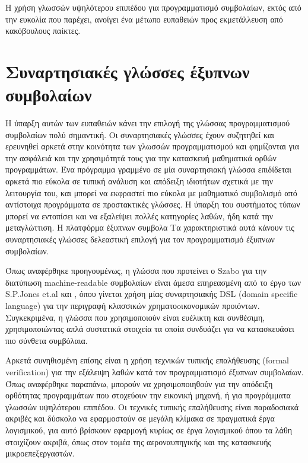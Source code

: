Η χρήση γλωσσών υψηλότερου επιπέδου για προγραμματισμό συμβολαίων, εκτός από την ευκολία που
παρέχει, ανοίγει ένα μέτωπο ευπαθειών προς εκμετάλλευση από κακόβουλους παίκτες. 




\section{Συναρτησιακές γλώσσες έξυπνων συμβολαίων} \label{dsls}


Η ύπαρξη αυτών των ευπαθειών κάνει την επιλογή της γλώσσας προγραμματισμού συμβολαίων πολύ
σημαντική. Οι συναρτησιακές γλώσσες έχουν συζητηθεί και ερευνηθεί αρκετά στην κοινότητα των
γλωσσών προγραμματισμού και φημίζονται για την ασφάλειά και την χρησιμότητά τους για την κατασκευή
μαθηματικά ορθών προγραμμάτων. Ένα πρόγραμμα γραμμένο σε μία συναρτησιακή γλώσσα επιδίδεται 
αρκετά πιο εύκολα σε τυπική ανάλυση και απόδειξη ιδιοτήτων σχετικά με την λειτουργία του, και μπορεί
να εκφραστεί πιο εύκολα με μαθηματικό συμβολισμό από αντίστοιχα προγράμματα σε προστακτικές γλώσσες. 
Η ύπαρξη του συστήματος τύπων μπορεί να εντοπίσει και να εξαλείψει πολλές κατηγορίες λαθών, ήδη
κατά την μεταγλώττιση. Η πλατφόρμα έξυπνων συμβολα
 Τα χαρακτηριστικά αυτά κάνουν τις συναρτησιακές γλώσσες δελεαστική
επιλογή για τον προγραμματισμό έξυπνων συμβολαίων.


Όπως αναφέρθηκε προηγουμένως,  η γλώσσα που προτείνει ο Szabo για την διατύπωση machine-readable συμβολαίων είναι άμεσα επηρεασμένη από το έργο των S.P.Jones et.al 
\cite{composingcontracts}  και \cite{howtowriteacontract}, όπου γίνεται χρήση μίας συναρτησιακής DSL
 (domain specific language) για την περιγραφή κλασσικών χρηματοoικονομικών προιόντων. Συγκεκριμένα, η
   γλώσσα που χρησιμοποιούν είναι ευέλικτη και συνθέσιμη, χρησιμοποιώντας απλά συστατικά στοιχεία τα
     οποία συνδυάζει για να κατασκευάσει πιο σύνθετα συμβόλαια. 
     
     
     
         Αρκετά συνηθισμένη επίσης είναι η χρήση τεχνικών τυπικής επαλήθευσης (formal verification) για
                    την εξάλειψη λαθών κατά τον προγραμματισμό έξυπνων συμβολαίων. Όπως αναφέρθηκε παραπάνω, μπορούν να χρησιμοποιηθούν για την απόδειξη ορθότητας προγραμμάτων που στοχεύουν
                    την εικονική μηχανή, ή για προγράμματα γλωσσών υψηλότερου επιπέδου.
                    Οι τεχνικές τυπικής επαλήθευσης
                      είναι παραδοσιακά ακριβές και δύσκολο να εφαρμοστούν σε μεγάλη κλίμακα σε πραγματικά έργα
                        λογισμικού, για αυτό βρίσκουν εφαρμογή κυρίως σε έργα λογισμικού όπου τα λάθη στοιχίζουν ακριβά,
                          όπως στον τομέα της αεροναυπηγικής και της κατασκευής μικροεπεξεργαστών.
                                   
